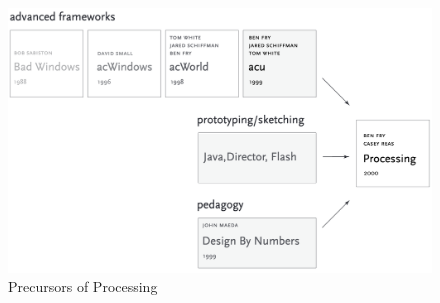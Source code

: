 \begin{figure}
    \includegraphics[max width=\textwidth]{images/fry2004-frameworks.png} 
    \caption{Precursors of Processing \parencite[127]{fryComputationalInformationDesign2004}}
    \label{fig:dbn}
  \end{figure}

